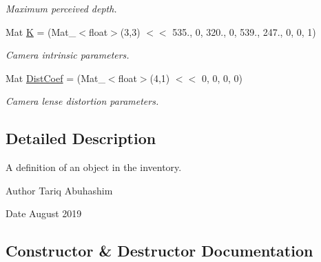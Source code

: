 \begin{DoxyCompactItemize}
\begin{DoxyCompactList}\small\item\em Maximum perceived depth. \end{DoxyCompactList}\item 
Mat \hyperlink{classMapObject_adee82f6f637c2dbb2d790656a4197433}{K} = (Mat\+\_\+$<$float$>$(3,3) $<$$<$ 535., 0, 320., 0, 539., 247., 0, 0, 1)\hypertarget{classMapObject_adee82f6f637c2dbb2d790656a4197433}{}\label{classMapObject_adee82f6f637c2dbb2d790656a4197433}

\begin{DoxyCompactList}\small\item\em Camera intrinsic parameters. \end{DoxyCompactList}\item 
Mat \hyperlink{classMapObject_a61efc581be10370a4f2de8a5c4145dcc}{Dist\+Coef} = (Mat\+\_\+$<$float$>$(4,1) $<$$<$ 0, 0, 0, 0)\hypertarget{classMapObject_a61efc581be10370a4f2de8a5c4145dcc}{}\label{classMapObject_a61efc581be10370a4f2de8a5c4145dcc}

\begin{DoxyCompactList}\small\item\em Camera lense distortion parameters. \end{DoxyCompactList}\end{DoxyCompactItemize}


\subsection{Detailed Description}
A definition of an object in the inventory. 

\begin{DoxyAuthor}{Author}
Tariq Abuhashim 
\end{DoxyAuthor}
\begin{DoxyDate}{Date}
August 2019 
\end{DoxyDate}


\subsection{Constructor \& Destructor Documentation}
